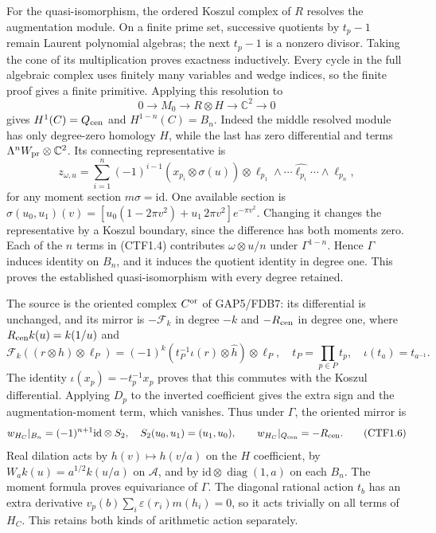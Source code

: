 For the quasi-isomorphism, the ordered Koszul complex of \(R\) resolves
the augmentation module. On a finite prime set, successive quotients by
\(t_p-1\) remain Laurent polynomial algebras; the next \(t_p-1\) is a
nonzero divisor. Taking the cone of its multiplication proves exactness
inductively. Every cycle in the full algebraic complex uses finitely
many variables and wedge indices, so the finite proof gives a finite
primitive. Applying this resolution to \[
0\to M_0\to R\otimes H\to\mathbb C^2\to0
\] gives \(H^1(C)=Q_{\rm cen}\) and \(H^{1-n}(C)=B_n\). Indeed the
middle resolved module has only degree-zero homology \(H\), while the
last has zero differential and terms
\(\Lambda^nW_{\rm pr}\otimes\mathbb C^2\). Its connecting representative
is \[
z_{\omega,u}=
\sum_{i=1}^n(-1)^{i-1}
(x_{p_i}\otimes\sigma(u))\otimes
\ell_{p_1}\wedge\cdots\widehat{\ell_{p_i}}\cdots\wedge\ell_{p_n},
\tag{CTF1.4}
\] for any moment section \(m\sigma=\mathrm{id}\). One available section
is \(\sigma(u_0,u_1)(v)=[u_0(1-2\pi v^2)+u_1\,2\pi v^2]e^{-\pi v^2}\).
Changing it changes the representative by a Koszul boundary, since the
difference has both moments zero. Each of the \(n\) terms in (CTF1.4)
contributes \(\omega\otimes u/n\) under \(\Gamma^{1-n}\). Hence
\(\Gamma\) induces identity on \(B_n\), and it induces the quotient
identity in degree one. This proves the established quasi-isomorphism
with every degree retained.

The source is the oriented complex \(C^{\rm or}\) of GAP5/FDB7: its
differential is unchanged, and its mirror is \(-\mathcal F_k\) in degree
\(-k\) and \(-R_{\rm cen}\) in degree one, where
\(R_{\rm cen}k(u)=k(1/u)\) and \[
\mathcal F_k((r\otimes h)\otimes\ell_P)
=(-1)^k(t_P^{-1}\iota(r)\otimes\widehat h)\otimes\ell_P,\quad
t_P=\prod_{p\in P}t_p,\quad\iota(t_a)=t_{a^{-1}}.
\tag{CTF1.5}
\] The identity \(\iota(x_p)=-t_p^{-1}x_p\) proves that this commutes
with the Koszul differential. Applying \(D_p\) to the inverted
coefficient gives the extra sign and the augmentation-moment term, which
vanishes. Thus under \(\Gamma\), the oriented mirror is \[
w_{H_C}|_{B_n}=(-1)^{n+1}\mathrm{id}\otimes S_2,\quad
S_2(u_0,u_1)=(u_1,u_0),\qquad
w_{H_C}|_{Q_{\rm cen}}=-R_{\rm cen}.
\tag{CTF1.6}
\] Real dilation acts by \(h(v)\mapsto h(v/a)\) on the \(H\)
coefficient, by \(W_ak(u)=a^{1/2}k(u/a)\) on \(\mathcal A\), and by
\(\mathrm{id}\otimes\operatorname{diag}(1,a)\) on each \(B_n\). The
moment formula proves equivariance of \(\Gamma\). The diagonal rational
action \(t_b\) has an extra derivative
\(v_p(b)\sum_i\varepsilon(r_i)m(h_i)=0\), so it acts trivially on all
terms of \(H_C\). This retains both kinds of arithmetic action
separately.

